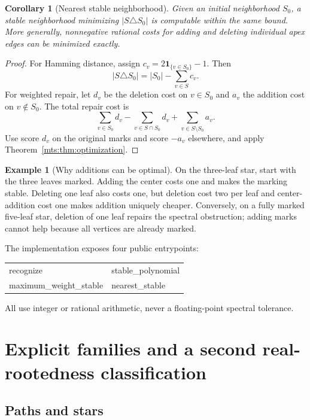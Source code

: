 \documentclass[11pt]{article}
\numberwithin{equation}{section}
\newtheorem{corollary}[theorem]{Corollary}
\theoremstyle{definition}
\newtheorem{example}[theorem]{Example}%
\newcommand{\ind}{\mathbf 1}
\begin{document}
\begin{corollary}[Nearest stable neighborhood]\label{mts:cor:repair}
Given an initial neighborhood $S_0$, a stable neighborhood minimizing
$|S\triangle S_0|$ is computable within the same bound. More generally,
nonnegative rational costs for adding and deleting individual apex edges
can be minimized exactly.
\end{corollary}
\begin{proof}
For Hamming distance, assign
$c_v=2\ind_{\{v\in S_0\}}-1$. Then
\[
 |S\triangle S_0|=|S_0|-\sum_{v\in S}c_v.
\]
For weighted repair, let $d_v$ be the deletion cost on $v\in S_0$ and
$a_v$ the addition cost on $v\notin S_0$. The total repair cost is
\[
 \sum_{v\in S_0}d_v
 -\sum_{v\in S\cap S_0}d_v
 +\sum_{v\in S\setminus S_0}a_v.
\]
Use score $d_v$ on the original marks and score $-a_v$ elsewhere, and
apply Theorem~\ref{mts:thm:optimization}.
\end{proof}

\begin{example}[Why additions can be optimal]
On the three-leaf star, start with the three leaves marked. Adding the
center costs one and makes the marking stable. Deleting one leaf also
costs one, but deletion cost two per leaf and center-addition cost one
makes addition uniquely cheaper. Conversely, on a fully marked five-leaf
star, deletion of one leaf repairs the spectral obstruction; adding
marks cannot help because all vertices are already marked.
\end{example}

The implementation exposes four public entrypoints:
\begin{center}\small\ttfamily
\begin{tabular}{ll}
recognize & stable\_polynomial\\
maximum\_weight\_stable & nearest\_stable
\end{tabular}
\end{center}
All use integer or rational arithmetic, never a floating-point spectral tolerance.

\section{Explicit families and a second real-rootedness classification}\label{mts:sec:shape}

\subsection{Paths and stars}
\end{document}
